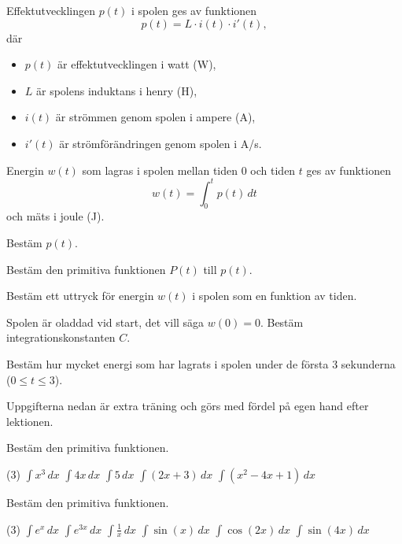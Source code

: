 Effektutvecklingen $p(t)$ i spolen ges av funktionen
\[
  p(t) = L \cdot i(t) \cdot i'(t),
\]
där
\begin{itemize}
  \item $p(t)$ är effektutvecklingen i watt (W),
  \item $L$ är spolens induktans i henry (H),
  \item $i(t)$ är strömmen genom spolen i ampere (A),
  \item $i'(t)$ är strömförändringen genom spolen i A/s.
\end{itemize}
Energin $w(t)$ som lagras i spolen mellan tiden $0$ och tiden $t$ ges av funktionen
\[
  w(t) = \int_0^t p(t)\,dt
\]
och mäts i joule (J).
\begin{parts}
  \item Bestäm $p(t)$.
  \item Bestäm den primitiva funktionen $P(t)$ till $p(t)$.
  \item Bestäm ett uttryck för energin $w(t)$ i spolen som en funktion av tiden.
  \item Spolen är oladdad vid start, det vill säga $w(0) = 0$. Bestäm integrationskonstanten $C$.
  \item Bestäm hur mycket energi som har lagrats i spolen under de första $3$ sekunderna
    (${0 \leq t \leq 3}$).
\end{parts}

Uppgifterna nedan är extra träning och görs med fördel på egen hand efter lektionen.

Bestäm den primitiva funktionen.
\begin{delar}(3)
  \task $\displaystyle\int x^3\,dx$
  \task $\displaystyle\int 4x\,dx$
  \task $\displaystyle\int 5\,dx$
  \task $\displaystyle\int (2x + 3)\,dx$
  \task $\displaystyle\int (x^2 - 4x + 1)\,dx$
\end{delar}

Bestäm den primitiva funktionen.
\begin{delar}(3)
  \task $\displaystyle\int e^x\,dx$
  \task $\displaystyle\int e^{3x}\,dx$
  \task $\displaystyle\int \frac{1}{x}\,dx$
  \task $\displaystyle\int \sin(x)\,dx$
  \task $\displaystyle\int \cos(2x)\,dx$
  \task $\displaystyle\int \sin(4x)\,dx$
\end{delar}

